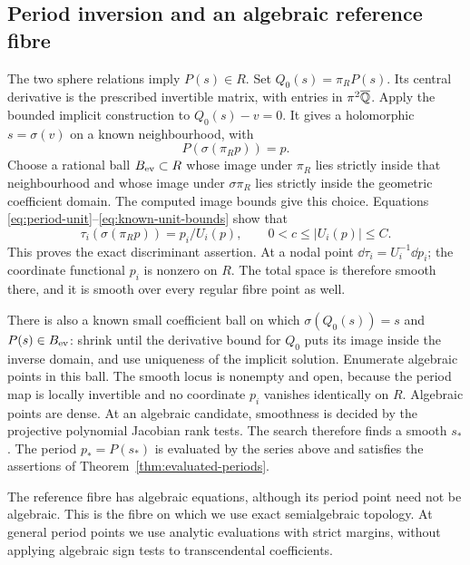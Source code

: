 \subsection{Period inversion and an algebraic reference fibre}

The two sphere relations imply $P(s)\in R$. Set
$Q_0(s)=\pi_RP(s)$. Its central derivative is the prescribed
invertible matrix, with entries in $\pi^2\overline{\mathbb Q}$.
Apply the bounded implicit construction to $Q_0(s)-v=0$.
It gives a holomorphic $s=\sigma(v)$ on a known neighbourhood, with
\begin{equation}\label{eq:inverse-period-identity}
                    P(\sigma(\pi_Rp))=p.
\end{equation}
Choose a rational ball $B_{\rm ev}\subset R$ whose image under
$\pi_R$ lies strictly inside that neighbourhood and whose image under
$\sigma\pi_R$ lies strictly inside the geometric coefficient domain.
The computed image bounds give this choice. Equations
\eqref{eq:period-unit}--\eqref{eq:known-unit-bounds} show that
\[
 \tau_i(\sigma(\pi_Rp))=p_i/U_i(p),\qquad
                  0<c\le|U_i(p)|\le C.
\]
This proves the exact discriminant assertion. At a nodal point
$\dd\tau_i=U_i^{-1}\dd p_i$; the coordinate functional $p_i$
is nonzero on $R$. The total space is therefore smooth there,
and it is smooth over every regular fibre point as well.

There is also a known small coefficient ball on which
$\sigma(Q_0(s))=s$ and $P(s)\in B_{\rm ev}$: shrink until the
derivative bound for $Q_0$ puts its image inside the inverse domain,
and use uniqueness of the implicit solution. Enumerate algebraic
points in this ball. The smooth locus is nonempty and open, because
the period map is locally invertible and no coordinate $p_i$ vanishes
identically on $R$. Algebraic points are dense. At an algebraic
candidate, smoothness is decided by the projective polynomial
Jacobian rank tests. The search therefore finds a smooth $s_*$.
The period $p_*=P(s_*)$ is evaluated by the series above and satisfies
the assertions of Theorem~\ref{thm:evaluated-periods}.

The reference fibre has algebraic equations, although its period point
need not be algebraic. This is the fibre on which we use exact
semialgebraic topology. At general period points we use analytic
evaluations with strict margins, without applying algebraic sign
tests to transcendental coefficients.
